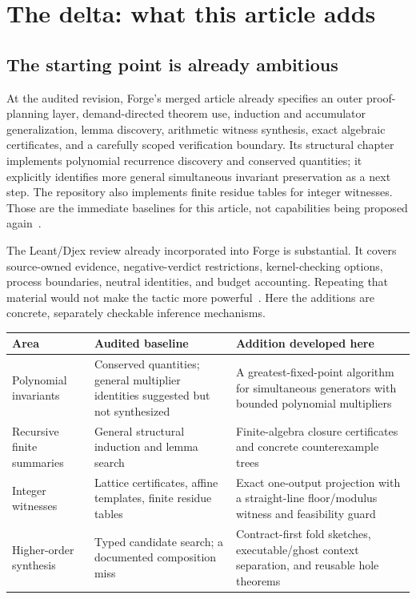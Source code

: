 \documentclass[11pt,a4paper]{article}
\theoremstyle{definition}
\theoremstyle{remark}
\begin{document}
\section{The delta: what this article adds}
\label{sec:delta}

\subsection{The starting point is already ambitious}
At the audited revision, Forge's merged article already specifies an outer
proof-planning layer, demand-directed theorem use, induction and accumulator
generalization, lemma discovery, arithmetic witness synthesis, exact algebraic
certificates, and a carefully scoped verification boundary. Its structural
chapter implements polynomial recurrence discovery and conserved quantities;
it explicitly identifies more general simultaneous invariant preservation as a
next step. The repository also implements finite residue tables for integer
witnesses. Those are the immediate baselines for this article, not capabilities
being proposed again~\cite{forge-readme,forge-structural,forge-conclusion}.

The Leant/Djex review already incorporated into Forge is substantial. It covers
source-owned evidence, negative-verdict restrictions, kernel-checking options,
process boundaries, neutral identities, and budget accounting. Repeating that
material would not make the tactic more powerful~\cite{forge-neighbors}.
Here the additions are concrete, separately checkable inference mechanisms.

\begin{center}
\small
\begin{tabularx}{\textwidth}{@{}p{}YY@{}}
\toprule
Area & Audited baseline & Addition developed here \\
\midrule
Polynomial invariants & Conserved quantities; general multiplier identities suggested but not synthesized & A greatest-fixed-point algorithm for simultaneous generators with bounded polynomial multipliers \\
Recursive finite summaries & General structural induction and lemma search & Finite-algebra closure certificates and concrete counterexample trees \\
Integer witnesses & Lattice certificates, affine templates, finite residue tables & Exact one-output projection with a straight-line floor/modulus witness and feasibility guard \\
Higher-order synthesis & Typed candidate search; a documented composition miss & Contract-first fold sketches, executable/ghost context separation, and reusable hole theorems \\
\bottomrule
\end{tabularx}
\end{center}
\end{document}
